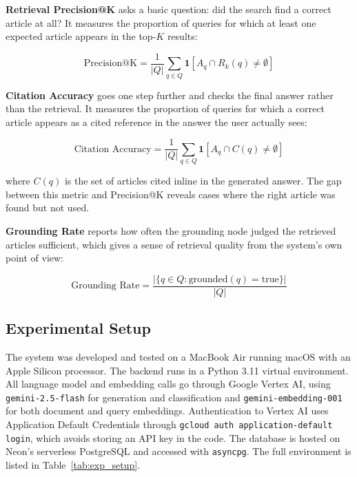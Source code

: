 \textbf{Retrieval Precision@K} asks a basic question: did the search find a correct
article at all? It measures the proportion of queries for which at least one expected
article appears in the top-$K$ results:

\begin{equation}
\text{Precision@K} = \frac{1}{|Q|} \sum_{q \in Q} \mathbf{1}[A_q \cap R_k(q) \neq \emptyset]
\end{equation}

\textbf{Citation Accuracy} goes one step further and checks the final answer rather than
the retrieval. It measures the proportion of queries for which a correct article appears
as a cited reference in the answer the user actually sees:

\begin{equation}
\text{Citation Accuracy} = \frac{1}{|Q|} \sum_{q \in Q} \mathbf{1}[A_q \cap C(q) \neq \emptyset]
\end{equation}

\noindent where $C(q)$ is the set of articles cited inline in the generated answer. The
gap between this metric and Precision@K reveals cases where the right article was found
but not used.

\textbf{Grounding Rate} reports how often the grounding node judged the retrieved
articles sufficient, which gives a sense of retrieval quality from the system's own point
of view:

\begin{equation}
\text{Grounding Rate} = \frac{|\{q \in Q : \text{grounded}(q) = \text{true}\}|}{|Q|}
\end{equation}

\subsection{Experimental Setup}

\hs The system was developed and tested on a MacBook Air running macOS with an Apple
Silicon processor. The backend runs in a Python 3.11 virtual environment. All language
model and embedding calls go through Google Vertex AI, using \texttt{gemini-2.5-flash}
for generation and classification and \texttt{gemini-embedding-001} for both document
and query embeddings. Authentication to Vertex AI uses Application Default Credentials
through \texttt{gcloud auth application-default login}, which avoids storing an API key in
the code. The database is hosted on Neon's serverless PostgreSQL and accessed with
\texttt{asyncpg}. The full environment is listed in Table~\ref{tab:exp_setup}.

